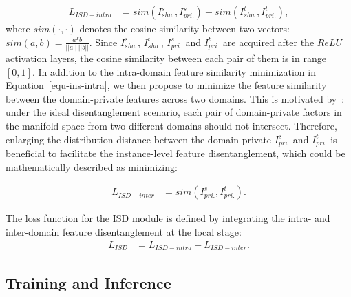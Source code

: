 \documentclass[journal]{IEEEtran}
\begin{document}
\begin{equation}
\begin{aligned}
L_{ISD-intra} & = sim(I_{sha.}^{s}, I_{pri.}^{s}) + sim(I_{sha.}^{t},I_{pri.}^{t}),
\label{equ-ins-intra}
\end{aligned}
\end{equation}
where $sim (\cdot, \cdot)$ denotes the cosine similarity between two vectors: $sim(a, b)  = \frac{a^T b}{||a||~||b||}$. Since $I_{sha.}^{s}$, $I_{sha.}^{t}$, $I_{pri.}^{s}$ and $I_{pri.}^{t}$ are acquired after the $ReLU$ activation layers, the cosine similarity between each pair of them is in range $[0, 1]$. In addition to the intra-domain feature similarity minimization in Equation~\ref{equ-ins-intra}, we then propose to minimize the feature similarity between the domain-private features across two domains. This is motivated by~\cite{chattopadhyay2020learning}: under the ideal disentanglement scenario, each pair of domain-private factors in the manifold space from two different domains should not intersect. Therefore, enlarging the distribution distance between the domain-private $I_{pri.}^{s}$ and $I_{pri.}^{t}$ is beneficial to facilitate the instance-level feature disentanglement, which could be mathematically described as minimizing:

\begin{equation}
\begin{aligned}
L_{ISD-inter} & = sim(I_{pri.}^{s},I_{pri.}^{t}).
\label{equ-ins-inter}
\end{aligned}
\end{equation}


The loss function for the ISD module is defined by integrating the intra- and inter-domain feature disentanglement at the local stage:
\begin{equation}
\begin{aligned}
L_{ISD} & = L_{ISD-intra} + L_{ISD-inter}. 
\label{equ-isd}
\end{aligned}
\end{equation}



\subsection{Training and Inference\label{sec-imp}}
\end{document}
